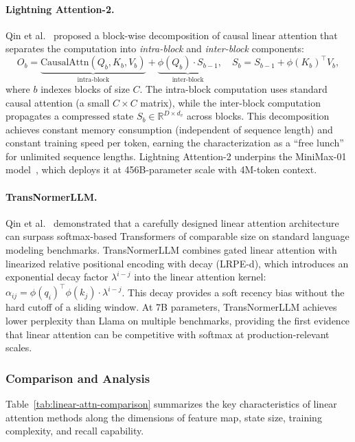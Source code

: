 \paragraph{Lightning Attention-2.}
Qin et al.~\cite{qin2024lightning} proposed a block-wise decomposition of causal linear attention that separates the computation into \emph{intra-block} and \emph{inter-block} components:
\begin{equation}
O_b = \underbrace{\text{CausalAttn}(Q_b, K_b, V_b)}_{\text{intra-block}} + \underbrace{\phi(Q_b) \cdot S_{b-1}}_{\text{inter-block}}, \quad S_b = S_{b-1} + \phi(K_b)^\top V_b,
\label{eq:lightning}
\end{equation}
where $b$ indexes blocks of size $C$. The intra-block computation uses standard causal attention (a small $C \times C$ matrix), while the inter-block computation propagates a compressed state $S_b \in \mathbb{R}^{D \times d_v}$ across blocks. This decomposition achieves constant memory consumption (independent of sequence length) and constant training speed per token, earning the characterization as a ``free lunch'' for unlimited sequence lengths. Lightning Attention-2 underpins the MiniMax-01 model~\cite{minimax2025}, which deploys it at 456B-parameter scale with 4M-token context.

\paragraph{TransNormerLLM.}
Qin et al.~\cite{qin2024transnormerllm} demonstrated that a carefully designed linear attention architecture can surpass softmax-based Transformers of comparable size on standard language modeling benchmarks. TransNormerLLM combines gated linear attention with linearized relative positional encoding with decay (LRPE-d), which introduces an exponential decay factor $\lambda^{i-j}$ into the linear attention kernel: $\alpha_{ij} = \phi(q_i)^\top \phi(k_j) \cdot \lambda^{i-j}$. This decay provides a soft recency bias without the hard cutoff of a sliding window. At 7B parameters, TransNormerLLM achieves lower perplexity than Llama on multiple benchmarks, providing the first evidence that linear attention can be competitive with softmax at production-relevant scales.

\subsubsection{Comparison and Analysis}

Table~\ref{tab:linear-attn-comparison} summarizes the key characteristics of linear attention methods along the dimensions of feature map, state size, training complexity, and recall capability.

